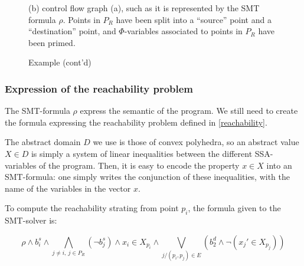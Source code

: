 \documentclass[a4paper,english,titlepage,11pt]{article}
\begin{document}
\begin{figure}[!h]
\begin{minipage}[c]{.49\linewidth}

(b) control flow graph (a), such as it is represented by the SMT formula $\rho$.
Points in $P_R$ have been split into a ``source'' point and a ``destination''
point, and $\Phi$-variables associated to points in $P_R$ have been primed.
\end{minipage} 
\caption{Example (cont'd)}
\end{figure}

	\subsubsection{Expression of the reachability problem}

	The SMT-formula $\rho$ express the semantic of the program. We still need to create the
	formula expressing the reachability problem defined in \ref{reachability}.

	The abstract domain $D$ we use is those of convex polyhedra, so an abstract
	value $X \in D$ is simply a system of linear inequalities between the
	different SSA-variables of the program. Then, it is easy to encode the
	property $x \in X$ into an SMT-formula: one simply writes the conjunction of
	these inequalities, with the name of the variables in the vector $x$.

	To compute the reachability strating from point $p_i$, the formula given to
	the SMT-solver is:

	$$\rho \wedge b_i^s \wedge \bigwedge_{j\neq i,\ j\in P_R} (\neg b_j^s)
	\wedge x_i \in X_{p_i} \wedge \bigvee_{j/(p_i,p_j)\in E} (b_2^d \wedge \neg
	(x_j' \in X_{p_j}))$$
\end{document}
